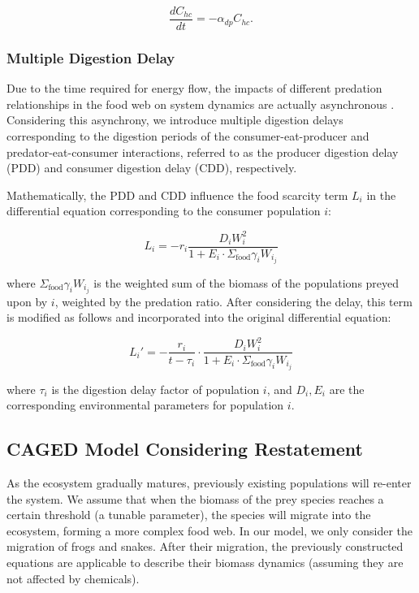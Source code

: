 \documentclass{HZNUMCM}
\begin{document}
        \begin{equation}
        \frac{dC_{hc}}{dt} = - \alpha_{dp} C_{hc}.
        \end{equation}
      
      \subsubsection{Multiple Digestion Delay}
        Due to the time required for energy flow, 
        the impacts of different predation relationships in the food web on system dynamics are actually asynchronous \cite{GUO20142850}. 
        Considering this asynchrony, 
        we introduce multiple digestion delays corresponding to the digestion periods of the consumer-eat-producer and predator-eat-consumer interactions, 
        referred to as the producer digestion delay (PDD) and consumer digestion delay (CDD), respectively.

        Mathematically, the PDD and CDD influence the food scarcity term \(L_i\) in the differential equation corresponding to the consumer population \(i\):
        
        \begin{equation}
        L_i = -r_i \frac{D_i W_i^2}{1 + E_i \cdot \Sigma_{\text{food}} \gamma_i W_{i_j}}
        \end{equation}

        where \(\Sigma_{\text{food}} \gamma_i W_{i_j}\) is the weighted sum of the biomass of the populations preyed upon by \(i\), weighted by the predation ratio. 
        After considering the delay, this term is modified as follows and incorporated into the original differential equation:
        
        \begin{equation}
        L_i' = -\frac{r_i}{t - \tau_i} \cdot \frac{D_i W_i^2}{1 + E_i \cdot \Sigma_{\text{food}} \gamma_i W_{i_j}}
        \end{equation}

        where \(\tau_i\) is the digestion delay factor of population \(i\), and \(D_i, E_i\) are the corresponding environmental parameters for population \(i\).
    \subsection{CAGED Model Considering Restatement}
      As the ecosystem gradually matures, previously existing populations will re-enter the system. We assume that when the biomass of the prey species reaches a certain threshold (a tunable parameter), the species will migrate into the ecosystem, forming a more complex food web. In our model, we only consider the migration of frogs and snakes. After their migration, the previously constructed equations are applicable to describe their biomass dynamics (assuming they are not affected by chemicals).
\end{document}
